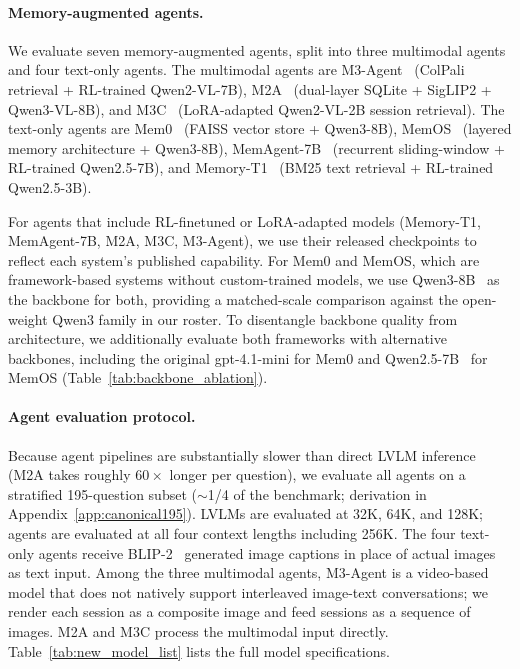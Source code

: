\documentclass{article}
\begin{document}
\paragraph{Memory-augmented agents.}
We evaluate seven memory-augmented agents, split into three multimodal agents and four text-only agents. The multimodal agents are M3-Agent~\cite{long2025seeinglisteningrememberingreasoning} (ColPali~\cite{faysse2025colpaliefficientdocumentretrieval} retrieval + RL-trained Qwen2-VL-7B), M2A~\cite{m2a} (dual-layer SQLite + SigLIP2 + Qwen3-VL-8B), and M3C~\cite{jang2025enablingchatbotseyesears} (LoRA-adapted Qwen2-VL-2B session retrieval). The text-only agents are Mem0~\cite{mem0} (FAISS vector store + Qwen3-8B), MemOS~\cite{li2025memosoperatingmemoryaugmentedgeneration} (layered memory architecture + Qwen3-8B), MemAgent-7B~\cite{yu2025memagentreshapinglongcontextllm} (recurrent sliding-window + RL-trained Qwen2.5-7B), and Memory-T1~\cite{du2025memoryt1reinforcementlearningtemporal} (BM25 text retrieval + RL-trained Qwen2.5-3B).

For agents that include RL-finetuned or LoRA-adapted models (Memory-T1, MemAgent-7B, M2A, M3C, M3-Agent), we use their released checkpoints to reflect each system's published capability. For Mem0 and MemOS, which are framework-based systems without custom-trained models, we use Qwen3-8B~\citep{yang2025qwen3technicalreport} as the backbone for both, providing a matched-scale comparison against the open-weight Qwen3 family in our roster. To disentangle backbone quality from architecture, we additionally evaluate both frameworks with alternative backbones, including the original gpt-4.1-mini for Mem0 and Qwen2.5-7B~\citep{qwen2024qwen25} for MemOS (Table~\ref{tab:backbone_ablation}).

\paragraph{Agent evaluation protocol.}
Because agent pipelines are substantially slower than direct LVLM inference (M2A takes roughly $60\times$ longer per question), we evaluate all agents on a stratified 195-question subset ($\sim$1/4 of the benchmark; derivation in Appendix~\ref{app:canonical195}). LVLMs are evaluated at 32K, 64K, and 128K; agents are evaluated at all four context lengths including 256K. The four text-only agents receive BLIP-2~\cite{li2023blip2} generated image captions in place of actual images as text input. Among the three multimodal agents, M3-Agent is a video-based model that does not natively support interleaved image-text conversations; we render each session as a composite image and feed sessions as a sequence of images. M2A and M3C process the multimodal input directly. Table~\ref{tab:new_model_list} lists the full model specifications.
\end{document}
